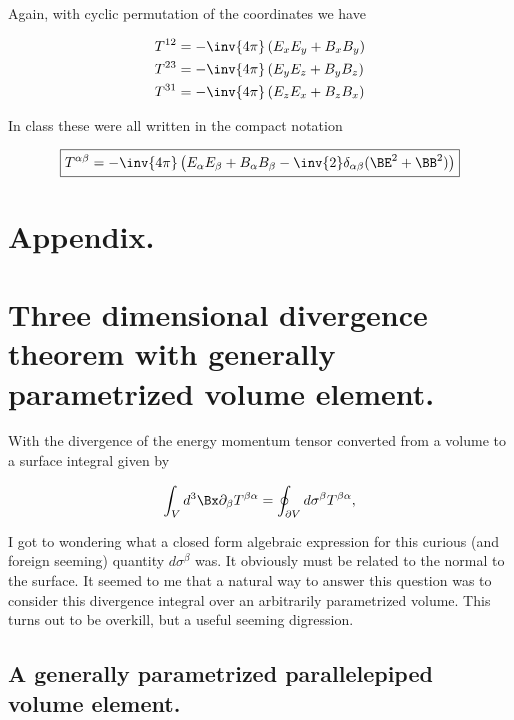 Again, with cyclic permutation of the coordinates we have

\begin{align}\label{eqn:relativisticElectrodynamicsPS6:300}
T^{1 2} &= -\inv{4 \pi} \left( E_x E_y + B_x B_y \right) \\
T^{2 3} &= -\inv{4 \pi} \left( E_y E_z + B_y B_z \right) \\
T^{3 1} &= -\inv{4 \pi} \left( E_z E_x + B_z B_x \right) 
\end{align}

In class these were all written in the compact notation

\begin{equation}\label{eqn:relativisticElectrodynamicsPS6:320}
\boxed{
T^{\alpha \beta} = -\inv{4 \pi} \left( 
E_\alpha E_\beta 
+B_\alpha B_\beta 
- \inv{2} \delta_{\alpha\beta} (\BE^2 + \BB^2) \right)
}
\end{equation}

\section{Appendix.}

\section{Three dimensional divergence theorem with generally parametrized volume element.}

With the divergence of the energy momentum tensor converted from a volume to a surface integral given by

\begin{equation}\label{eqn:relativisticElectrodynamicsPS6:340}
\int_V d^3 \Bx \partial_\beta T^{\beta \alpha} = \oint_{\partial V} d \sigma^\beta T^{\beta \alpha},
\end{equation}

I got to wondering what a closed form algebraic expression for this curious (and foreign seeming) quantity $d \sigma^\beta$ was.  It obviously must be related to the normal to the surface.  It seemed to me that a natural way to answer this question was to consider this divergence integral over an arbitrarily parametrized volume.  This turns out to be overkill, but a useful seeming digression.

\subsection{A generally parametrized parallelepiped volume element.}

